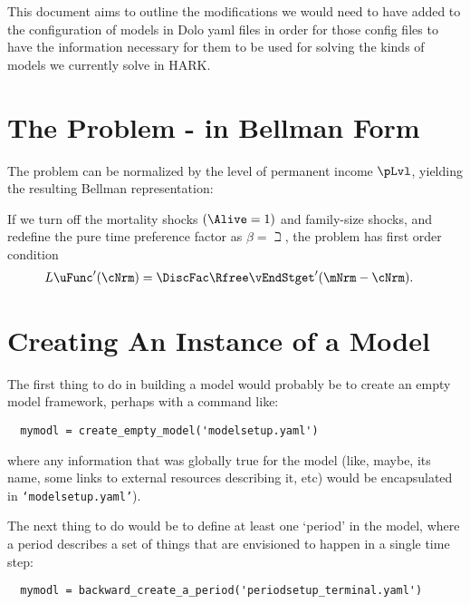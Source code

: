 \documentclass[SolvingMicroDSOPs]{subfiles}
\begin{document}

This document aims to outline the modifications we would need to have added to the configuration of models in Dolo yaml files in order for those config files to have the information necessary for them to be used for solving the kinds of models we currently solve in HARK.

\section{The Problem - in Bellman Form}





The problem can be normalized by the level of permanent income $\pLvl$, yielding the resulting Bellman representation:






If we turn off the mortality shocks $(\Alive=1)$ and family-size shocks, and redefine the pure time preference factor as $\beta=\beth$, the problem has first order condition
\begin{align}
L   \uFunc^{\prime}(\cNrm) & = \DiscFac \Rfree \vEndStget^{\prime}(\mNrm - \cNrm).  \label{eq:FOCstep}
\end{align}

\section{Creating An Instance of a Model}

The first thing to do in building a model would probably be to create an empty model framework, perhaps with a command like:
\begin{verbatim}
  mymodl = create_empty_model('modelsetup.yaml')
\end{verbatim}
where any information that was globally true for the model (like, maybe, its name, some links to external resources describing it, etc) would be encapsulated in \texttt{`modelsetup.yaml'}).

The next thing to do would be to define at least one `period' in the model, where a period describes a set of things that are envisioned to happen in a single time step:
\begin{verbatim}
  mymodl = backward_create_a_period('periodsetup_terminal.yaml')
\end{verbatim}
\end{document}
